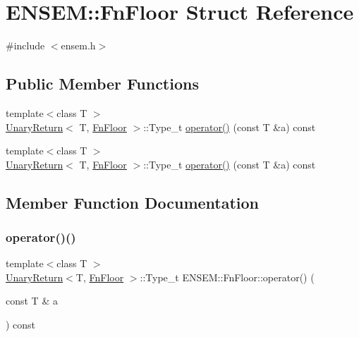 \hypertarget{structENSEM_1_1FnFloor}{}\section{E\+N\+S\+EM\+:\+:Fn\+Floor Struct Reference}
\label{structENSEM_1_1FnFloor}


{\ttfamily \#include $<$ensem.\+h$>$}

\subsection*{Public Member Functions}
\begin{DoxyCompactItemize}
\item 
{\footnotesize template$<$class T $>$ }\\\mbox{\hyperlink{structENSEM_1_1UnaryReturn}{Unary\+Return}}$<$ T, \mbox{\hyperlink{structENSEM_1_1FnFloor}{Fn\+Floor}} $>$\+::Type\+\_\+t \mbox{\hyperlink{structENSEM_1_1FnFloor_a4452d47aaa4edbfb7644f14a1b3e55f0}{operator()}} (const T \&a) const
\item 
{\footnotesize template$<$class T $>$ }\\\mbox{\hyperlink{structENSEM_1_1UnaryReturn}{Unary\+Return}}$<$ T, \mbox{\hyperlink{structENSEM_1_1FnFloor}{Fn\+Floor}} $>$\+::Type\+\_\+t \mbox{\hyperlink{structENSEM_1_1FnFloor_a4452d47aaa4edbfb7644f14a1b3e55f0}{operator()}} (const T \&a) const
\end{DoxyCompactItemize}


\subsection{Member Function Documentation}
\mbox{\label{structENSEM_1_1FnFloor_a4452d47aaa4edbfb7644f14a1b3e55f0}} 
\subsubsection{\texorpdfstring{operator()()}{operator()()}\hspace{0.1cm}{\footnotesize\ttfamily [1/2]}}
{\footnotesize\ttfamily template$<$class T $>$ \\
\mbox{\hyperlink{structENSEM_1_1UnaryReturn}{Unary\+Return}}$<$T, \mbox{\hyperlink{structENSEM_1_1FnFloor}{Fn\+Floor}} $>$\+::Type\+\_\+t E\+N\+S\+E\+M\+::\+Fn\+Floor\+::operator() (\begin{DoxyParamCaption}\item[{const T \&}]{a }\end{DoxyParamCaption}) const\hspace{0.3cm}{\ttfamily [inline]}}

